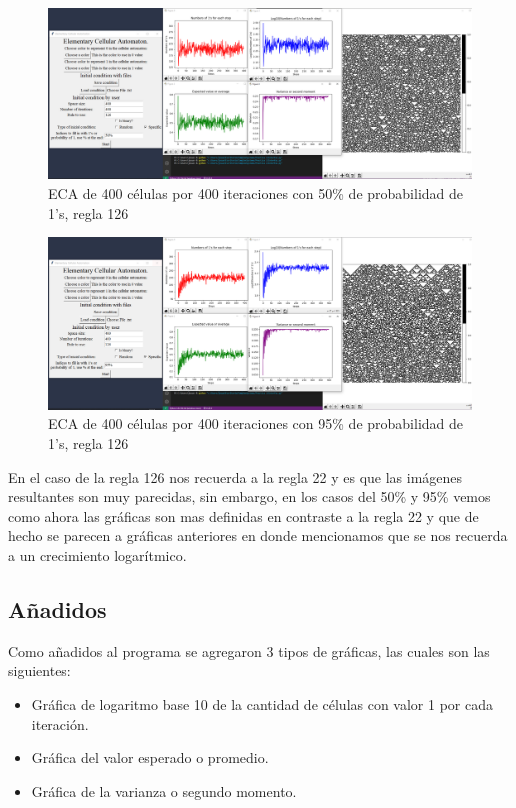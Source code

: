 \documentclass[11pt]{article}
\begin{document}
		\begin{figure}[H]
			\centering
			\includegraphics[scale=0.26]{resources/add17.png}
			\caption{ECA de 400 células por 400 iteraciones con 50\% de probabilidad de 1's, regla 126}								\label{fig:picture}
		\end{figure}
		\begin{figure}[H]
			\centering
			\includegraphics[scale=0.26]{resources/add18.png}
			\caption{ECA de 400 células por 400 iteraciones con 95\% de probabilidad de 1's, regla 126}								\label{fig:picture}
		\end{figure}
		En el caso de la regla 126 nos recuerda a la regla 22 y es que las imágenes resultantes son muy parecidas, sin embargo, en los casos del 50\% y 95\% vemos como ahora las gráficas son mas definidas en contraste a la regla 22 y que de hecho se parecen a gráficas anteriores en donde mencionamos que se nos recuerda a un crecimiento logarítmico.
		\subsection{Añadidos}
		Como añadidos al programa se agregaron 3 tipos de gráficas, las cuales son las siguientes:
		\begin{itemize}
    		\item Gráfica de logaritmo base 10 de la cantidad de células con valor 1 por cada iteración.
		    \item Gráfica del valor esperado o promedio.
		    \item Gráfica de la varianza o segundo momento.
		\end{itemize}\par		
\end{document}
